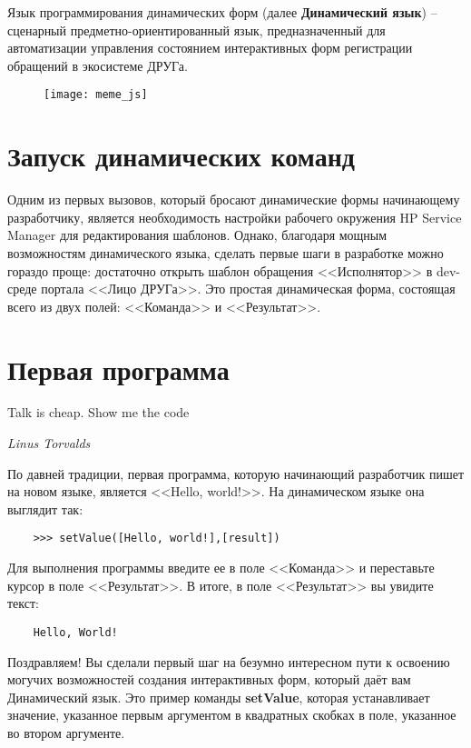 \documentclass[../index.tex]{subfiles}
\begin{document}
        Язык программирования динамических форм (далее \textbf{Динамический язык}) -- сценарный предметно-ориентированный язык, предназначенный для автоматизации управления состоянием 
        интерактивных форм регистрации обращений в экосистеме ДРУГа.
        
    \begin{figure}[h]
       	\texttt{[image: meme\_js]}
       	\centering
    \end{figure}
        
        
    \section{Запуск динамических команд}
    Одним из первых вызовов, который бросают динамические формы начинающему разработчику, является необходимость настройки рабочего окружения HP Service Manager для редактирования шаблонов. Однако, благодаря мощным возможностям динамического языка, сделать первые шаги в разработке можно гораздо проще: достаточно открыть шаблон обращения <<Исполнятор>> в dev-среде портала <<Лицо ДРУГа>>. Это простая динамическая форма, состоящая всего из двух полей: <<Команда>> и <<Результат>>.
    
    \section{Первая программа}
        
    \epigraph{Talk is cheap. Show me the code}{\textit{Linus Torvalds}}
    
    По давней традиции, первая программа, которую начинающий разработчик пишет на новом языке, является <<Hello, world!>>. На динамическом языке она выглядит так:
    \begin{verbatim}
    >>> setValue([Hello, world!],[result])
    \end{verbatim}
    
    Для выполнения программы введите ее в поле <<Команда>> и переставьте курсор в поле <<Результат>>. В итоге, в поле <<Результат>> вы увидите текст:
    
    \begin{verbatim}
    Hello, World!
    \end{verbatim}
    
    Поздравляем! Вы сделали первый шаг на безумно интересном пути к освоению могучих возможностей создания интерактивных форм, который даёт вам Динамический язык.
    Это пример команды {\bf setValue}, которая устанавливает значение, указанное первым аргументом в квадратных скобках в поле, указанное во втором аргументе.
    
\end{document}
